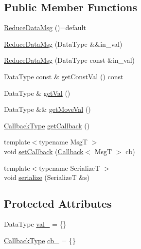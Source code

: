 \subsection*{Public Member Functions}
\begin{DoxyCompactItemize}
\item 
\hyperlink{structvt_1_1collective_1_1reduce_1_1operators_1_1_reduce_data_msg_ab5f090157aff94fa6b1c233ccc5e0e04}{Reduce\+Data\+Msg} ()=default
\item 
\hyperlink{structvt_1_1collective_1_1reduce_1_1operators_1_1_reduce_data_msg_af154e207e5fbafd8e78baa5986410b34}{Reduce\+Data\+Msg} (Data\+Type \&\&in\+\_\+val)
\item 
\hyperlink{structvt_1_1collective_1_1reduce_1_1operators_1_1_reduce_data_msg_aced8854f365eaf92ca71d527337fc804}{Reduce\+Data\+Msg} (Data\+Type const \&in\+\_\+val)
\item 
Data\+Type const  \& \hyperlink{structvt_1_1collective_1_1reduce_1_1operators_1_1_reduce_data_msg_a57969fcf4e5b2eda7aa6ec2cccc0c785}{get\+Const\+Val} () const
\item 
Data\+Type \& \hyperlink{structvt_1_1collective_1_1reduce_1_1operators_1_1_reduce_data_msg_ae4ed4be0171d566910da896198f38131}{get\+Val} ()
\item 
Data\+Type \&\& \hyperlink{structvt_1_1collective_1_1reduce_1_1operators_1_1_reduce_data_msg_a2f8b87edccc2e4db3c193350f066ca08}{get\+Move\+Val} ()
\item 
\hyperlink{structvt_1_1collective_1_1reduce_1_1operators_1_1_reduce_data_msg_a299d0d7f62e0e631ef344e345d89a4f3}{Callback\+Type} \hyperlink{structvt_1_1collective_1_1reduce_1_1operators_1_1_reduce_data_msg_a108582ea1b61db277a5dae6ac08cc708}{get\+Callback} ()
\item 
{\footnotesize template$<$typename MsgT $>$ }\\void \hyperlink{structvt_1_1collective_1_1reduce_1_1operators_1_1_reduce_data_msg_afc3de5443774bc3838c9ccca05054210}{set\+Callback} (\hyperlink{namespacevt_a36db99df4c973d48b1118a293fff533f}{Callback}$<$ MsgT $>$ cb)
\item 
{\footnotesize template$<$typename SerializeT $>$ }\\void \hyperlink{structvt_1_1collective_1_1reduce_1_1operators_1_1_reduce_data_msg_a78111e98f011e95f293e5e763a300c51}{serialize} (SerializeT \&s)
\end{DoxyCompactItemize}
\subsection*{Protected Attributes}
\begin{DoxyCompactItemize}
\item 
Data\+Type \hyperlink{structvt_1_1collective_1_1reduce_1_1operators_1_1_reduce_data_msg_a3d393a0bf3245aeac348b66be4e566f9}{val\+\_\+} = \{\}
\item 
\hyperlink{structvt_1_1collective_1_1reduce_1_1operators_1_1_reduce_data_msg_a299d0d7f62e0e631ef344e345d89a4f3}{Callback\+Type} \hyperlink{structvt_1_1collective_1_1reduce_1_1operators_1_1_reduce_data_msg_a89c7b9270ac15672f38c7256abe3c044}{cb\+\_\+} = \{\}
\end{DoxyCompactItemize}

